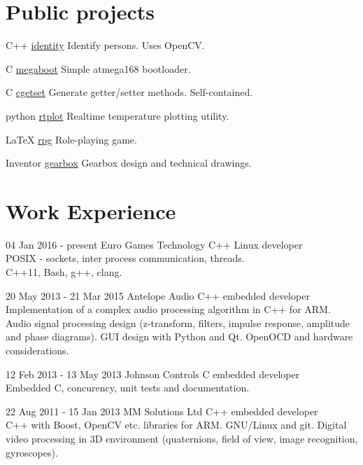 \documentclass{tccv}
\begin{document}
\section{Public projects}
\begin{yearlist}
\item{C++}
     {\href{https://github.com/MiroslavVitkov/identity}{identity}}
     {Identify persons. Uses OpenCV.}

\item{C}
     {\href{https://github.com/MiroslavVitkov/megaboot}{megaboot}}
     {Simple atmega168 bootloader.}

\item{C}
     {\href{https://github.com/MiroslavVitkov/cgetset}{cgetset}}
     {Generate getter/setter methods. Self-contained.}

\item{python}
     {\href{https://github.com/MiroslavVitkov/rtplot}{rtplot}}
     {Realtime temperature plotting utility.}

\item{LaTeX}
     {\href{https://github.com/MiroslavVitkov/rpg}{rpg}}
     {Role-playing game.}

\item{Inventor}
     {\href{https://github.com/MiroslavVitkov/gearbox}{gearbox}}
     {Gearbox design and technical drawings.}
\end{yearlist}


\pagebreak
\section{Work Experience}
\begin{eventlist}
\item{04 Jan 2016 - present}
     {Euro Games Technology}
     {C++ Linux developer}             \\
POSIX - sockets, inter process communication, threads.  \\
C++11, Bash, g++, clang.                                \\

\item{20 May 2013 - 21 Mar 2015}
     {Antelope Audio}
     {C++ embedded developer}          \\
Implementation of a complex audio processing algorithm in C++ for ARM.
Audio signal processing design (z-transform, filters, impulse response, amplitude and phase diagrams).
GUI design with Python and Qt.
OpenOCD and hardware considerations.   \\

\item{12 Feb 2013 - 13 May 2013}
     {Johnson Controls}
     {C embedded developer} \\
Embedded C, concurency, unit tests and documentation.  \\

\item{22 Aug 2011 - 15 Jan 2013}
     {MM Solutions Ltd}
     {C++ embedded developer} \\
C++ with Boost, OpenCV etc. libraries for ARM.
GNU/Linux and git.
Digital video processing in 3D environment (quaternions, field of view, image recognition, gyroscopes).
\end{eventlist}
\end{document}
